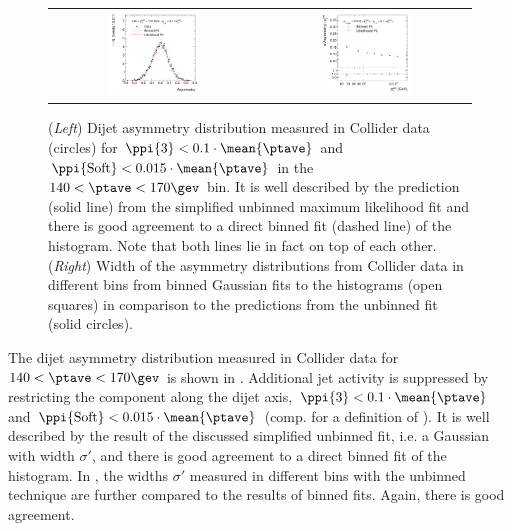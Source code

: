 \begin{figure}[ht]
  \label{fig:ResFit:Asym:Simple}
  \centering
  \begin{tabular}{cc}
    \includegraphics[width=0.45\textwidth]{figures/MaxLikeSimple_Data132440-144011_Eta00-13_PtAsymmetry_PtBin4_Pt3Cut3} &
    \includegraphics[width=0.45\textwidth]{figures/MaxLikeSimple_Data132440-144011_Eta00-13_PtAsymmetryWidthBottomRatio_Pt3Cut3} \\
\end{tabular}
  \caption{(\textit{Left}) Dijet asymmetry distribution measured in
    Collider data (circles) for \mbox{$\ppi{3} < 0.1\cdot\mean{\ptave}$} and \mbox{$\ppi{\text{Soft}} < 0.015\cdot\mean{\ptave}$} in the \mbox{$140 < \ptave < 170\gev$} bin.
    It is well described by the prediction (solid line) from the
    simplified unbinned maximum likelihood fit and there is good agreement to a direct binned
    fit (dashed line) of the histogram.
    Note that both lines lie in fact on top of each other.
    (\textit{Right}) Width of the asymmetry distributions from
    Collider data in different \ptave bins from binned Gaussian fits to the
    histograms (open squares) in comparison to the predictions from
    the unbinned fit (solid circles).}
\end{figure}

The dijet asymmetry distribution measured in Collider data for \mbox{$140 <
  \ptave < 170\gev$} is shown in
.
Additional jet activity is suppressed by restricting the \pt component
along the dijet axis, \mbox{$\ppi{3} < 0.1\cdot\mean{\ptave}$} and
\mbox{$\ppi{\text{Soft}} < 0.015\cdot\mean{\ptave}$} (comp.  for
a definition of \ppi).
It is well described by the result of the discussed simplified unbinned fit, i.e. a Gaussian with width $\sigma'$, and there is good agreement to a direct binned fit of the histogram.
In , the widths $\sigma'$ measured in different \ptave bins with the unbinned technique are further compared to the results of binned fits.
Again, there is good agreement.


